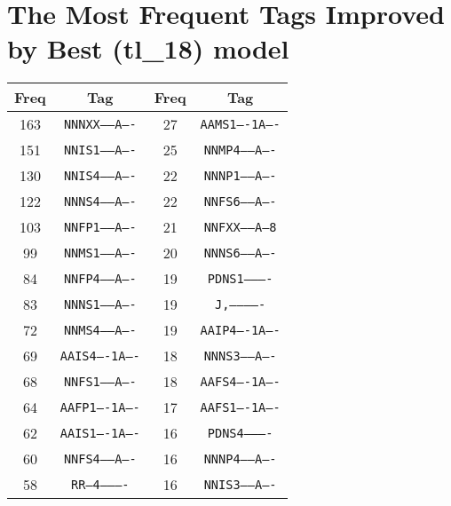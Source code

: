 \section{The Most Frequent Tags Improved by Best (tl\_18) model}
\label{att:tags1}
\begin{table}[!h]
\centering
\begin{tabular}{|c|c||c|c|}
\hline
Freq & Tag & Freq & Tag \\ \hline \hline
163 & \texttt{NNNXX-----A----} & 27 & \texttt{AAMS1----1A----}                         \\
151 & \texttt{NNIS1-----A----} & 25 & \texttt{NNMP4-----A----}                         \\
130 & \texttt{NNIS4-----A----} & 22 & \texttt{NNNP1-----A----}                         \\
122 & \texttt{NNNS4-----A----} & 22 & \texttt{NNFS6-----A----}                         \\
103 & \texttt{NNFP1-----A----} & 21 & \texttt{NNFXX-----A---8}                         \\
99  & \texttt{NNMS1-----A----} & 20 & \texttt{NNNS6-----A----}                         \\
84  & \texttt{NNFP4-----A----} & 19 & \texttt{PDNS1----------}                         \\
83  & \texttt{NNNS1-----A----} & 19 & \texttt{J,-------------}                         \\
72  & \texttt{NNMS4-----A----} & 19 & \texttt{AAIP4----1A----}                         \\
69  & \texttt{AAIS4----1A----} & 18 & \texttt{NNNS3-----A----}                         \\
68  & \texttt{NNFS1-----A----} & 18 & \texttt{AAFS4----1A----}                         \\
64  & \texttt{AAFP1----1A----} & 17 & \texttt{AAFS1----1A----}                         \\
62  & \texttt{AAIS1----1A----} & 16 & \texttt{PDNS4----------}                         \\
60  & \texttt{NNFS4-----A----} & 16 & \texttt{NNNP4-----A----}                         \\
58  & \texttt{RR--4----------} & 16 & \texttt{NNIS3-----A----}                         \\

\end{tabular}
\end{table}
